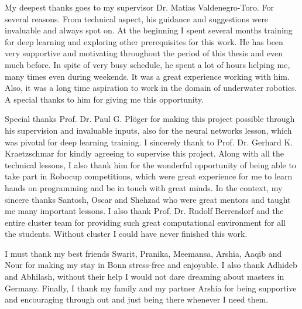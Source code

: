 \documentclass[thesis]{mas_report}
\begin{document}
\begin{acknowledgements}
 My deepest thanks goes to my supervisor Dr. Matias Valdenegro-Toro. For several reasons. From technical aspect, his guidance and suggestions were invaluable and always spot on.
 At the beginning I spent several months training for deep learning and exploring other prerequisites for this work. He has been very supportive and motivating throughout the period of this thesis and even much before.
 In spite of very busy schedule, he spent a lot of hours helping me, many times even during weekends. It was a great experience working with him. Also, it was a long time aspiration to work in the domain of underwater robotics. 
 A special thanks to him for giving me this opportunity.
 
 Special thanks Prof. Dr. Paul G. Pl\"oger for making this project possible through his supervision and invaluable inputs, also for the neural networks lesson, which was pivotal for deep learning training.
 I sincerely thank to Prof. Dr. Gerhard K. Kraetzschmar for kindly agreeing to supervise this project. Along with all the technical lessons, 
 I also thank him for the wonderful opportunity of being able to take part in Robocup competitions, which were great experience for me to learn hands on programming and be in touch with great minds. In the context, 
 my sincere thanks Santosh, Oscar and Shehzad who were great mentors and taught me many important lessons. I also thank Prof. Dr. Rudolf Berrendorf and the entire cluster team for providing such great computational environment 
 for all the students. Without cluster I could have never finished this work.
 
 I must thank my best friends Swarit, Pranika, Meemansa, Arshia, Aaqib and Nour for making my stay in Bonn stress-free and enjoyable. I also thank Adhideb and Abhilash, without their help I would not dare dreaming about masters in Germany.
 Finally, I thank my family and my partner Arshia for being supportive and encouraging through out and just being there whenever I need them. 
  
\end{acknowledgements}


\tableofcontents
\listoffigures
\listoftables

\end{document}
